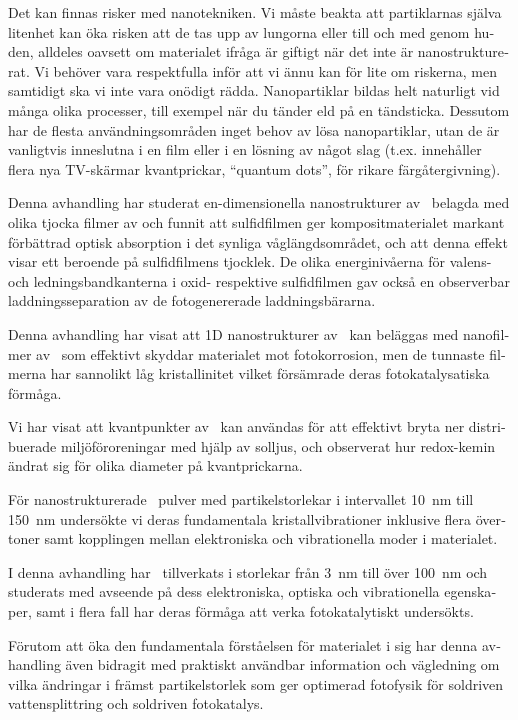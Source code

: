 \documentclass[webedition,openright,titles,swedish,english]{LuaUUThesis}\usepackage[]{graphicx}\usepackage[]{xcolor}
\begin{document}
\begin{otherlanguage}{swedish}
Det kan finnas risker med nanotekniken.
Vi måste beakta att partiklarnas själva litenhet kan öka risken att de tas
upp av lungorna eller till och med genom huden, alldeles oavsett om materialet
ifråga är giftigt när det inte är nanostrukturerat.
Vi behöver vara respektfulla inför att vi ännu kan för lite om riskerna,
men samtidigt ska vi inte vara onödigt rädda.
Nanopartiklar bildas helt naturligt vid många olika processer, till exempel
när du tänder eld på en tändsticka.
Dessutom har de flesta användningsområden inget behov av lösa nanopartiklar,
utan de är vanligtvis inneslutna i en film eller i en lösning
av något slag (t.ex. innehåller flera nya TV-skärmar kvantprickar, \enquote{quantum dots},
för rikare färgåtergivning).



Denna avhandling har studerat en-dimensionella nanostrukturer av \ZnO\ belagda
med olika tjocka filmer av  och funnit att sulfidfilmen ger kompositmaterialet
markant förbättrad optisk absorption i det synliga våglängdsområdet, och att
denna effekt visar ett beroende på sulfidfilmens tjocklek.
De olika energinivåerna för valens- och ledningsbandkanterna i oxid- respektive
sulfidfilmen gav också en observerbar laddningsseparation av de fotogenererade
laddningsbärarna.

Denna avhandling har visat att 1D nanostrukturer av \ZnO\ kan beläggas med
nanofilmer av \ironox\ som effektivt skyddar materialet mot fotokorrosion,
men de tunnaste filmerna har sannolikt låg kristallinitet vilket
försämrade deras fotokatalysatiska förmåga.

Vi har visat att kvantpunkter av \ZnO\ kan användas för att effektivt
bryta ner distribuerade miljöföroreningar med hjälp av solljus,
och observerat hur redox-kemin ändrat sig för olika diameter på kvantprickarna.

För nanostrukturerade \ZnO\ pulver med partikelstorlekar i intervallet
\qty{10}{\nm} till \qty{150}{\nm} undersökte vi
deras fundamentala kristallvibrationer inklusive flera övertoner samt kopplingen
mellan elektroniska och vibrationella moder i materialet.

I denna avhandling har \ZnO\ tillverkats i storlekar från \qty{3}{\nm} till över
\qty{100}{\nm} och studerats med avseende på dess elektroniska, optiska och
vibrationella egenskaper, samt i flera fall har deras förmåga att verka fotokatalytiskt
undersökts.

Förutom att öka den fundamentala förståelsen för materialet i sig har denna
avhandling även bidragit med praktiskt användbar information och vägledning
om vilka ändringar i främst partikelstorlek som ger optimerad fotofysik för
soldriven vattensplittring och soldriven fotokatalys.
\end{otherlanguage}
\end{document}
